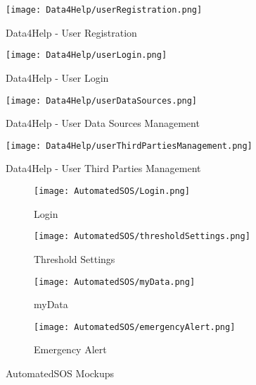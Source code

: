 \graphicspath{ {../Mockups/} }



\begin{figure}
  \texttt{[image: Data4Help/userRegistration.png]}
  \caption{Data4Help - User Registration}
  \label{Data4Help - User Registration}
\end{figure}

\begin{figure}
  \texttt{[image: Data4Help/userLogin.png]}
  \caption{Data4Help - User Login}
  \label{Data4Help - User Login}
\end{figure}

\begin{figure}
  \texttt{[image: Data4Help/userDataSources.png]}
  \caption{Data4Help - User Data Sources Management}
  \label{Data4Help - User Data Sources Management}
\end{figure}

\begin{figure}
  \texttt{[image: Data4Help/userThirdPartiesManagement.png]}
  \caption{Data4Help - User Third Parties Management}
  \label{Data4Help - User Third Parties Management}
\end{figure}



\begin{figure}[!ht]
  \centering
  \begin{subfigure}[b]{0.4\linewidth}
    \texttt{[image: AutomatedSOS/Login.png]}
    \caption{Login}
  \end{subfigure}\hfill
  \begin{subfigure}[b]{0.4\linewidth}
    \texttt{[image: AutomatedSOS/thresholdSettings.png]}
    \caption{Threshold Settings}
  \end{subfigure}
  \par\bigskip
  \begin{subfigure}[b]{0.4\linewidth}
    \texttt{[image: AutomatedSOS/myData.png]}
    \caption{myData}
  \end{subfigure}\hfill
  \begin{subfigure}[b]{0.4\linewidth}
    \texttt{[image: AutomatedSOS/emergencyAlert.png]}
    \caption{Emergency Alert}
  \end{subfigure}
  \caption{AutomatedSOS Mockups}
\end{figure}

